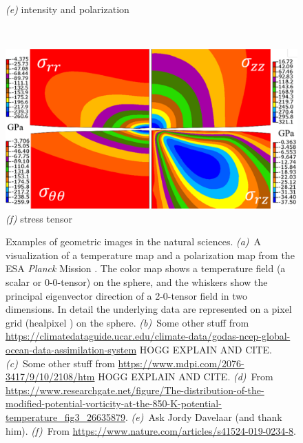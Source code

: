 \documentclass{article}
\newenvironment{hoggfigure}{%
  \begin{figure}[tp]%
    \begin{mdframed}%
    \color{captiongray}}{%
    \end{mdframed}%
  \end{figure}}
\theoremstyle{plain}
\begin{document}
\begin{hoggfigure}
\begin{center}
\begin{minipage}[b]{1.9in}
      \textsl{(e)} intensity and polarization
    \end{minipage}
    ~~\begin{minipage}[b]{2.5in}\noindent%
      \includegraphics[width=\textwidth]{41524.pdf}\\[1ex]
      \textsl{(f)} stress tensor
    \end{minipage}
  \end{center}
  \caption{Examples of geometric images in the natural sciences.
  \textsl{(a)}~A visualization of a temperature map and a polarization map from the ESA \textsl{Planck} Mission \cite{planck}.
  The color map shows a temperature field (a scalar or 0-0-tensor) on the sphere, and the whiskers show the principal eigenvector direction of a 2-0-tensor field in two dimensions.
  In detail the underlying data are represented on a pixel grid (healpixel \cite{healpix}) on the sphere.
  \textsl{(b)}~Some other stuff from \url{https://climatedataguide.ucar.edu/climate-data/godas-ncep-global-ocean-data-assimilation-system} HOGG EXPLAIN AND CITE.
  \textsl{(c)}~Some other stuff from \url{https://www.mdpi.com/2076-3417/9/10/2108/htm} HOGG EXPLAIN AND CITE.
  \textsl{(d)}~From \url{https://www.researchgate.net/figure/The-distribution-of-the-modified-potential-vorticity-at-the-850-K-potential-temperature_fig3_26635879}.
  \textsl{(e)}~Ask Jordy Davelaar (and thank him).
  \textsl{(f)}~From \url{https://www.nature.com/articles/s41524-019-0234-8}.
  \label{fig:examples}}
\end{hoggfigure}
\end{document}
